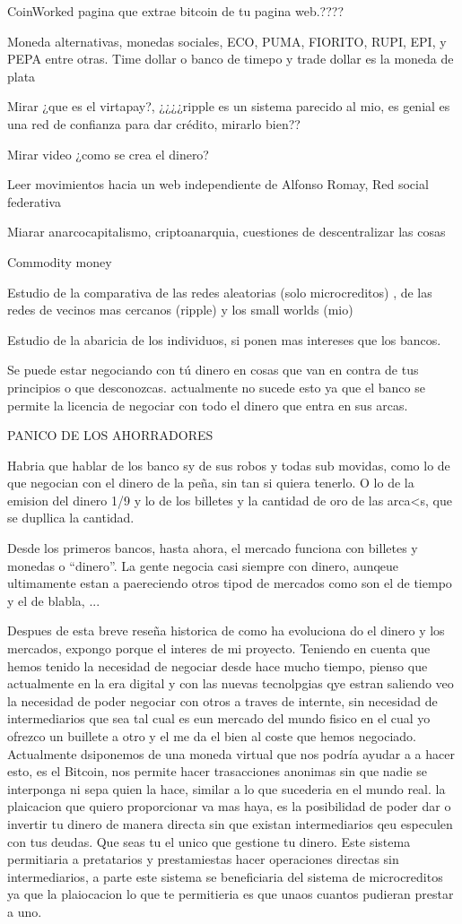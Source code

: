 CoinWorked pagina que extrae bitcoin de tu pagina web.????

Moneda alternativas, monedas sociales, ECO, PUMA, FIORITO, RUPI, EPI, y PEPA entre otras. Time dollar o banco de timepo y trade dollar es la moneda de plata

Mirar ¿que es el virtapay?, ¿¿¿¿ripple es un sistema parecido al mio, es genial es una red de confianza para dar crédito, mirarlo bien??

Mirar video ¿como se crea el dinero?

Leer movimientos hacia un web independiente de Alfonso Romay, Red social federativa

Miarar anarcocapitalismo, criptoanarquia, cuestiones de descentralizar las cosas

Commodity money

Estudio de la comparativa de las redes aleatorias (solo microcreditos) , de las redes de vecinos mas cercanos (ripple) y los small worlds (mio)

Estudio de la abaricia de los individuos, si ponen mas intereses que los bancos.

Se puede estar negociando con tú dinero en cosas que van en contra de tus principios o que desconozcas. actualmente no sucede esto ya que el banco se permite la licencia de negociar con todo el dinero que entra en sus arcas.

PANICO DE LOS AHORRADORES

Habria que hablar de los banco sy de sus robos y todas sub movidas, como lo de que negocian con el dinero de la peña, sin tan si quiera tenerlo. O lo de la emision del dinero 1/9 y lo de los billetes y la cantidad de oro de las arca<s, que se dupllica la cantidad.

Desde los primeros bancos, hasta ahora, el mercado funciona con billetes y monedas o ``dinero''. La gente negocia casi siempre con dinero, aunqeue ultimamente estan a paereciendo otros tipod de mercados como son el de tiempo y el de blabla, ...


Despues de esta breve reseña historica de como ha evoluciona do el dinero y los mercados, expongo porque el interes de mi proyecto. Teniendo en cuenta que hemos tenido la necesidad de negociar desde hace mucho tiempo, pienso que actualmente en la era digital y con las nuevas tecnolpgias qye estran saliendo veo la necesidad de poder negociar con otros a traves de internte, sin necesidad de intermediarios que sea tal cual es eun mercado del mundo fisico en el cual yo ofrezco un buillete a otro y el me da el bien al coste que hemos negociado. Actualmente dsiponemos de una moneda virtual que nos podría ayudar a a hacer esto, es el Bitcoin, nos permite hacer trasacciones anonimas sin que nadie se interponga ni sepa quien la hace, similar a lo que sucederia en el mundo real. la plaicacion que quiero proporcionar va mas haya, es la posibilidad de poder dar o invertir tu dinero de manera directa sin que existan intermediarios qeu especulen con tus deudas. Que seas tu el unico que gestione tu dinero. Este sistema permitiaria a pretatarios y prestamiestas hacer operaciones directas sin intermediarios, a parte este sistema se beneficiaria del sistema de microcreditos ya que la plaiocacion lo que te permitieria es que unaos cuantos pudieran prestar a uno.


